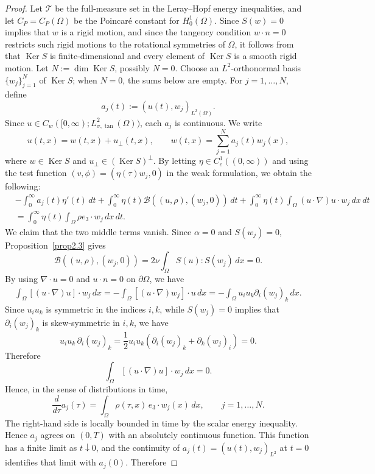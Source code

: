 \documentclass[11pt,reqno]{amsart}
\theoremstyle{plain}
\numberwithin{equation}{section}
\DeclareMathOperator{\kernel}{Ker}
\begin{document}
\begin{proof}
Let $\mathcal T$ be the full-measure set in the Leray--Hopf energy inequalities, and let $C_P=C_P(\Omega)$ be the Poincar\'e constant for $H^1_0(\Omega)$. Since $S(w)=0$ implies that $w$ is a rigid motion, and since the tangency condition $w\cdot n=0$ restricts such rigid motions to the rotational symmetries of $\Omega$, it follows from \cite[Lemma~7.1, Proposition~7.2, and Corollary~7.3]{Kelliher2025} that $\kernel S$ is finite-dimensional and every element of $\kernel S$ is a smooth rigid motion. Let $N:=\dim\kernel S$, possibly $N=0$. Choose an $L^2$-orthonormal basis $\{w_j\}_{j=1}^N$ of $\kernel S$; when $N=0$, the sums below are empty. For $j=1,\dots,N$, define
\[
a_j(t):=(u(t),w_j)_{L^2(\Omega)}.
\]
Since $u\in C_w([0,\infty);L^2_{\sigma,\tan}(\Omega))$, each $a_j$ is continuous. We write
\[
u(t,x)=w(t,x)+u_\perp(t,x),
\qquad
w(t,x)=\sum_{j=1}^N a_j(t)w_j(x),
\]
where $w\in\kernel S$ and $u_\perp\in(\kernel S)^\perp$.
By letting $\eta\in C^1_c((0,\infty))$ and using the test function $(v,\phi)=(\eta(\tau)w_j,0)$ in the weak formulation, we obtain the following:
\begin{align*}
&-\int_0^\infty a_j(t)\eta'(t)\,dt+\int_0^\infty\eta(t)\mathscr{B}((u,\rho),(w_j,0))\,dt+\int_0^\infty\eta(t)\int_\Omega(u\cdot\nabla)u\cdot w_j\,dx\,dt\\
&=\int_0^\infty\eta(t)\int_\Omega\rho e_3\cdot w_j\,dx\,dt.
\end{align*}
We claim that the two middle terms vanish. Since $\alpha=0$ and $S(w_j)=0$, Proposition~\ref{prop2.3} gives
\[
\mathscr{B}((u,\rho),(w_j,0))=2\nu\int_\Omega S(u):S(w_j)\,dx=0.
\]
By using $\nabla\cdot u=0$ and $u\cdot n=0$ on $\partial\Omega$, we have
\begin{align*}
\int_\Omega[(u\cdot\nabla)u]\cdot w_j\,dx=-\int_\Omega[(u\cdot\nabla)w_j]\cdot u\,dx=-\int_\Omega u_iu_k\partial_i(w_j)_k\,dx.
\end{align*}
Since \(u_i u_k\) is symmetric in the indices \(i,k\), while \(S(w_j)=0\) implies that
\(\partial_i(w_j)_k\) is skew-symmetric in \(i,k\), we have
\[
u_i u_k\,\partial_i(w_j)_k
=
\frac12 u_i u_k
\left(\partial_i(w_j)_k+\partial_k(w_j)_i\right)
=0.
\]
Therefore
\[
\int_\Omega[(u\cdot\nabla)u]\cdot w_j\,dx=0.
\]
Hence, in the sense of distributions in time, 
\begin{equation}\label{aj-ODE}
\frac{d}{d\tau} a_j(\tau)=\int_\Omega \rho(\tau,x)\, e_3\cdot w_j(x)\,dx,\qquad j=1,\dots,N.
\end{equation}
The right-hand side is locally bounded in time by the scalar energy inequality. Hence $a_j$ agrees on $(0,T)$ with an absolutely continuous function. This function has a finite limit as $t\downarrow0$, and the continuity of $a_j(t)=(u(t),w_j)_{L^2}$ at $t=0$ identifies that limit with $a_j(0)$. Therefore

\end{proof}
\end{document}
